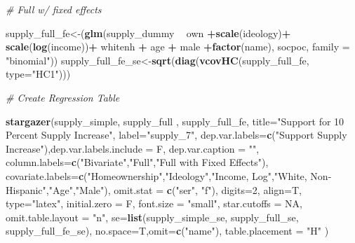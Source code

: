 \documentclass[]{article}
\newenvironment{Shaded}{\begin{snugshade}}{\end{snugshade}}
\newcommand{\CommentTok}[1]{\textcolor[rgb]{0.56,0.35,0.01}{\textit{#1}}}
\newcommand{\DataTypeTok}[1]{\textcolor[rgb]{0.13,0.29,0.53}{#1}}
\newcommand{\DecValTok}[1]{\textcolor[rgb]{0.00,0.00,0.81}{#1}}
\newcommand{\KeywordTok}[1]{\textcolor[rgb]{0.13,0.29,0.53}{\textbf{#1}}}
\newcommand{\NormalTok}[1]{#1}
\newcommand{\OperatorTok}[1]{\textcolor[rgb]{0.81,0.36,0.00}{\textbf{#1}}}
\newcommand{\OtherTok}[1]{\textcolor[rgb]{0.56,0.35,0.01}{#1}}
\newcommand{\StringTok}[1]{\textcolor[rgb]{0.31,0.60,0.02}{#1}}
\begin{document}
\begin{Shaded}
\begin{Highlighting}[]
{\CommentTok{# Full w/ fixed effects}

\NormalTok{supply_full_fe<-(}\KeywordTok{glm}\NormalTok{(supply_dummy }\OperatorTok{~}\StringTok{  }\NormalTok{own }\OperatorTok{+}\KeywordTok{scale}\NormalTok{(ideology)}\OperatorTok{+}\StringTok{ }\KeywordTok{scale}\NormalTok{(}\KeywordTok{log}\NormalTok{(income))}\OperatorTok{+}\StringTok{ }\NormalTok{whitenh  }\OperatorTok{+}\StringTok{ }\NormalTok{age }\OperatorTok{+}\StringTok{ }\NormalTok{male }\OperatorTok{+}\KeywordTok{factor}\NormalTok{(name), socpoc, }\DataTypeTok{family =} \StringTok{"binomial"}\NormalTok{))}
\NormalTok{supply_full_fe_se<-}\KeywordTok{sqrt}\NormalTok{(}\KeywordTok{diag}\NormalTok{(}\KeywordTok{vcovHC}\NormalTok{(supply_full_fe, }\DataTypeTok{type=}\StringTok{"HC1"}\NormalTok{)))}

\CommentTok{# Create Regression Table}

\KeywordTok{stargazer}\NormalTok{(supply_simple,  supply_full , supply_full_fe, }\DataTypeTok{title=}\StringTok{"Support for 10 Percent Supply Increase"}\NormalTok{, }\DataTypeTok{label=}\StringTok{"supply_7"}\NormalTok{,}
          \DataTypeTok{dep.var.labels=}\KeywordTok{c}\NormalTok{(}\StringTok{"Support Supply Increase"}\NormalTok{),}\DataTypeTok{dep.var.labels.include =}\NormalTok{ F, }\DataTypeTok{dep.var.caption =} \StringTok{""}\NormalTok{,}
          \DataTypeTok{column.labels=}\KeywordTok{c}\NormalTok{(}\StringTok{"Bivariate"}\NormalTok{,}\StringTok{"Full"}\NormalTok{,}\StringTok{"Full with Fixed Effects"}\NormalTok{),}
          \DataTypeTok{covariate.labels=}\KeywordTok{c}\NormalTok{(}\StringTok{"Homeownership"}\NormalTok{,}\StringTok{"Ideology"}\NormalTok{,}\StringTok{"Income, Log"}\NormalTok{,}\StringTok{"White, Non-Hispanic"}\NormalTok{,}\StringTok{"Age"}\NormalTok{,}\StringTok{"Male"}\NormalTok{),}
          \DataTypeTok{omit.stat =} \KeywordTok{c}\NormalTok{(}\StringTok{"ser"}\NormalTok{, }\StringTok{"f"}\NormalTok{), }\DataTypeTok{digits=}\DecValTok{2}\NormalTok{, }\DataTypeTok{align=}\NormalTok{T, }\DataTypeTok{type=}\StringTok{"latex"}\NormalTok{,}
          \DataTypeTok{initial.zero =}\NormalTok{ F,  }\DataTypeTok{font.size =} \StringTok{"small"}\NormalTok{, }\DataTypeTok{star.cutoffs =} \OtherTok{NA}\NormalTok{, }\DataTypeTok{omit.table.layout =} \StringTok{"n"}\NormalTok{,}
          \DataTypeTok{se=}\KeywordTok{list}\NormalTok{(supply_simple_se, supply_full_se, supply_full_fe_se), }\DataTypeTok{no.space=}\NormalTok{T,}\DataTypeTok{omit=}\KeywordTok{c}\NormalTok{(}\StringTok{"name"}\NormalTok{), }\DataTypeTok{table.placement =} \StringTok{"H"}\NormalTok{ )}


}
\end{Highlighting}
\end{Shaded}
\end{document}
